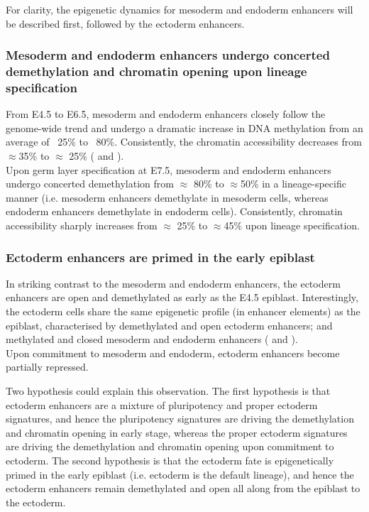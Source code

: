 For clarity, the epigenetic dynamics for mesoderm and endoderm enhancers will be described first, followed by the ectoderm enhancers.

\subsubsection{Mesoderm and endoderm enhancers undergo concerted demethylation and chromatin opening upon lineage specification}

From E4.5 to E6.5, mesoderm and endoderm enhancers closely follow the genome-wide trend and undergo a dramatic increase in DNA methylation from an average of ~25\% to ~80\%. Consistently, the chromatin accessibility decreases from $\approx$35\% to $\approx$ 25\% ( and ).\\
Upon germ layer specification at E7.5, mesoderm and endoderm enhancers undergo concerted demethylation from $\approx$ 80\% to $\approx$50\% in a lineage-specific manner (i.e. mesoderm enhancers demethylate in mesoderm cells, whereas endoderm enhancers demethylate in endoderm cells). Consistently, chromatin accessibility sharply increases from $\approx$ 25\% to $\approx$45\% upon lineage specification.



\subsubsection{Ectoderm enhancers are primed in the early epiblast}

In striking contrast to the mesoderm and endoderm enhancers, the ectoderm enhancers are open and demethylated as early as the E4.5 epiblast. Interestingly, the ectoderm cells share the same epigenetic profile (in enhancer elements) as the epiblast, characterised by demethylated and open ectoderm enhancers; and methylated and closed mesoderm and endoderm enhancers ( and ).\\
Upon commitment to mesoderm and endoderm, ectoderm enhancers become partially repressed.

Two hypothesis could explain this observation. The first hypothesis is that ectoderm enhancers are a mixture of pluripotency and proper ectoderm signatures, and hence the pluripotency signatures are driving the demethylation and chromatin opening in early stage, whereas the proper ectoderm signatures are driving the demethylation and chromatin opening upon commitment to ectoderm. The second hypothesis is that the ectoderm fate is epigenetically primed in the early epiblast (i.e. ectoderm is the default lineage), and hence the ectoderm enhancers remain demethylated and open all along from the epiblast to the ectoderm.

